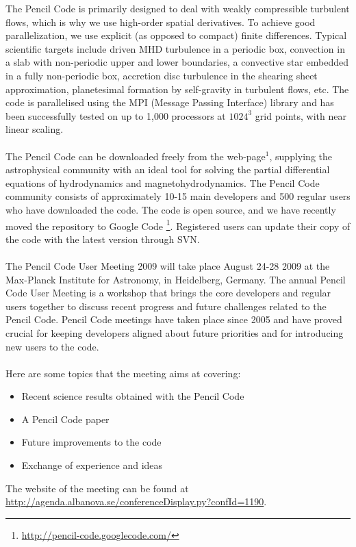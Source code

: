 \documentclass{article}
\begin{document}
The {\sc Pencil Code} is primarily designed to deal with weakly compressible
turbulent flows, which is why we use high-order spatial derivatives.  To
achieve good parallelization, we use explicit (as opposed to compact) finite
differences. Typical scientific targets include driven MHD turbulence in a
periodic box, convection in a slab with non-periodic upper and lower
boundaries, a convective star embedded in a fully non-periodic box, accretion
disc turbulence in the shearing sheet approximation, planetesimal formation by
self-gravity in turbulent flows, etc. The code is parallelised using the MPI
(Message Passing Interface) library and has been successfully tested on up to
1,000 processors at $1024^3$ grid points, with near linear scaling.
\\ \\
The {\sc Pencil Code} can be downloaded freely from the web-page$^1$, supplying the
astrophysical community with an ideal tool for solving the partial differential
equations of hydrodynamics and magnetohydrodynamics. The {\sc Pencil Code} community
consists of approximately 10-15 main developers and 500 regular users who have
downloaded the code. The code is open source, and we have recently moved the 
repository to Google Code
{\footnote{\url{http://pencil-code.googlecode.com/}}}. 
Registered users can update their copy of the code with the latest version 
through SVN.
\\ \\
The {\sc Pencil Code} User Meeting 2009 will take place August 24-28 2009 at the
Max-Planck Institute for Astronomy, in Heidelberg, Germany. The annual 
{\sc Pencil Code} User Meeting is a workshop
that brings the core developers and regular users together to discuss recent
progress and future challenges related to the {\sc Pencil Code}. Pencil
Code meetings have taken place since 2005 and have proved crucial for keeping
developers aligned about future priorities and for introducing new users to the
code.
\\ \\
Here are some topics that the meeting aims at covering:
\begin{itemize}
  \item Recent science results obtained with the {\sc Pencil Code}
  \item A {\sc Pencil Code} paper
   \item Future improvements to the code
  \item Exchange of experience and ideas
\end{itemize}
The website of the meeting can be found at\\
\url{http://agenda.albanova.se/conferenceDisplay.py?confId=1190}.\\
\end{document}
